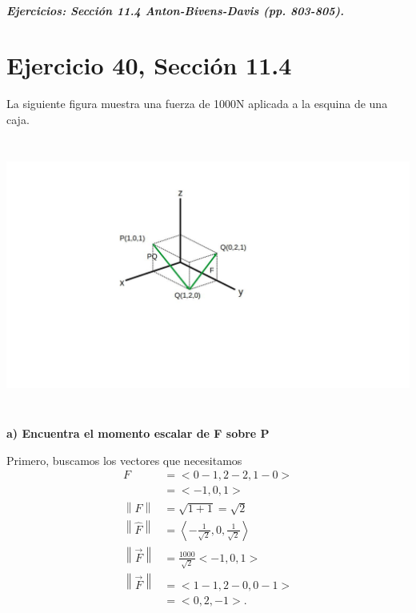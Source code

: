 \documentclass[11pt,letterpaper]{article}
\begin{document}
\subparagraph{Ejercicios: Sección 11.4 Anton-Bivens-Davis (pp. 803-805).}

\section{Ejercicio 40, Sección 11.4}
La siguiente figura muestra una fuerza de 1000N aplicada a la esquina de una caja.
\begin{center}
    \includegraphics[height=9cm]{imagenes/Ej40.jpg}
\end{center}

\textbf{a) Encuentra el momento escalar de F sobre P}

Primero, buscamos los vectores que necesitamos
\begin{equation*}
    \begin{split}
        F &= <0-1,2-2,1-0>\\
        &= <-1,0,1>\\
        \left\| F \right\| &= \sqrt{1+1} = \sqrt{2}\\
        \left\| \hat{F} \right\| &= \left< -\frac{1}{\sqrt{2}}, 0, \frac{1}{\sqrt{2}}\right>\\
        \left\| \overrightarrow{F} \right\| &= \frac{1000}{\sqrt{2}}<-1,0,1>\\
        \left\| \overrightarrow{F} \right\| &= <1-1,2-0,0-1>\\
        &=<0,2,-1>.
    \end{split}
\end{equation*}
\end{document}
